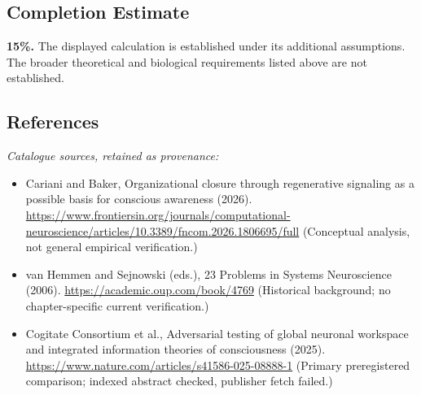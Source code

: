 \documentclass[11pt]{article}
\begin{document}
\subsection{Completion Estimate}
\textbf{15\%.} The displayed calculation is established under its additional assumptions. The broader theoretical and biological requirements listed above are not established.
\subsection{References}
\noindent\emph{Catalogue sources, retained as provenance:}
\begin{itemize}
\item Cariani and Baker, Organizational closure through regenerative signaling as a possible basis for conscious awareness (2026). \url{https://www.frontiersin.org/journals/computational-neuroscience/articles/10.3389/fncom.2026.1806695/full} (Conceptual analysis, not general empirical verification.)
\item van Hemmen and Sejnowski (eds.), 23 Problems in Systems Neuroscience (2006). \url{https://academic.oup.com/book/4769} (Historical background; no chapter-specific current verification.)
\item Cogitate Consortium et al., Adversarial testing of global neuronal workspace and integrated information theories of consciousness (2025). \url{https://www.nature.com/articles/s41586-025-08888-1} (Primary preregistered comparison; indexed abstract checked, publisher fetch failed.)
\end{itemize}
\clearpage


\appendix
\end{document}
